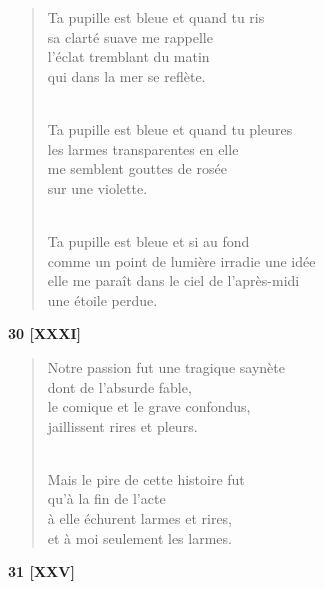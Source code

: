 \documentclass[a4paper,11pt]{book}
\begin{document}
\begin{verse}
Ta pupille est bleue et quand tu ris \\
sa clarté suave me rappelle \\
l'éclat tremblant du matin \\
qui dans la mer se reflète. \\ \

Ta pupille est bleue et quand tu pleures \\
les larmes transparentes en elle \\
me semblent gouttes de rosée \\
sur une violette. \\ \

Ta pupille est bleue et si au fond \\
comme un point de lumière irradie une idée \\
elle me paraît dans le ciel de l'après-midi \\
une étoile perdue. \\
\end{verse}

\bigskip

\begin{center} {\bf 30 [XXXI]} \end{center}

\begin{verse}
Notre passion fut une tragique saynète \\
dont de l'absurde fable, \\
le comique et le grave confondus, \\
jaillissent rires et pleurs. \\ \

Mais le pire de cette histoire fut \\
qu'à la fin de l'acte \\
à elle échurent larmes et rires, \\
et à moi seulement les larmes. \\
\end{verse}

\bigskip

\begin{center} {\bf 31 [XXV]} \end{center}
\end{document}
